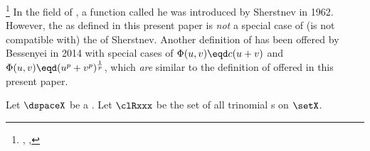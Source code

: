 \begin{remark}
\footnote{
  ,
  ,
  }
In the field of ,
a function called he  was introduced by Sherstnev in 1962.
However, the  as defined in this present paper is \emph{not} a special case of
(is not compatible with) the  of Sherstnev.
Another definition of  has been offered by Bessenyei in 2014
with special cases of $\Phi(u,v)\eqd c(u+v)$ and $\Phi(u,v)\eqd(u^p+v^p)^\frac{1}{p}$,
which \emph{are} similar to the definition of  offered in this present paper.
\end{remark}

\begin{definition}
\label{def:trirel}
\label{def:pdspace}
\label{def:ptineq}
Let $\dspaceX$ be a .
Let $\clRxxx$ be the set of all trinomial s  on $\setX$.
\end{definition}

